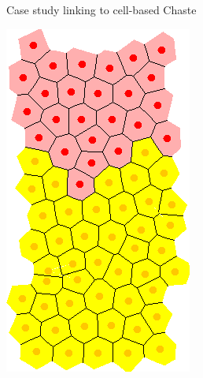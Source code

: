 \documentclass[t,xcolor={usenames,dvipsnames}]{beamer}
\begin{document}
\begin{frame}{Case study linking to cell-based Chaste}
\centering
\begin{minipage}{0.28\textwidth}
\includegraphics[width=.9\textwidth]{VariableWnt}
\end{minipage}
\begin{minipage}{0.39\textwidth}

\end{minipage}
\end{frame}
\end{document}
